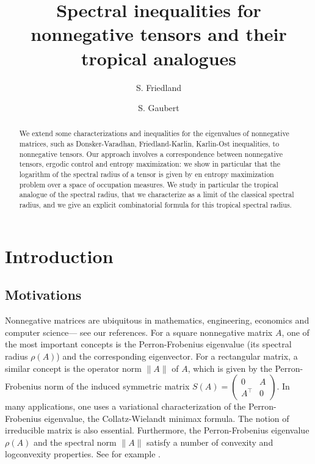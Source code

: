 \documentclass{amsart}
\newcommand{\0}{\mathbf{0}}
\newcommand{\1}{\mathbf{1}}
\newcommand{\trans}{^\top}
\theoremstyle{remark}
\numberwithin{equation}{section} %
\begin{document}
 \title[Spectral inequalities for nonnegative tensors]{
   Spectral inequalities for nonnegative tensors and their tropical analogues}
 \author{S. Friedland}
\author{
%
 S. Gaubert%
 }
%
%
%
%
%
\date{%
}
\address{%
 Department of Mathematics, Statistics and Computer Science,
 University of Illinois at Chicago, Chicago, Illinois 60607-7045,
 USA, \texttt{friedlan@uic.edu},
 }
\address{%
INRIA and Centre de Math\'ematiques Appliqu\'ees (CMAP), \'Ecole polytechnique, UMR 7641 CNRS, 91128 Palaiseau C\'edex, \texttt{stephane.gaubert@inria.fr} }
%



 \maketitle

%
 \begin{abstract}
We extend some characterizations and inequalities for the eigenvalues
of nonnegative matrices, such as Donsker-Varadhan, Friedland-Karlin,
Karlin-Ost inequalities,
%
to nonnegative tensors. Our approach involves
a correspondence between nonnegative tensors, ergodic control and entropy maximization: we show in particular that the logarithm of the spectral radius of a
tensor is given by en entropy maximization problem
over a space of occupation measures.
%
%
We study in particular the tropical analogue of the spectral radius,
that we characterize as a limit of the classical spectral radius,
and we give an explicit combinatorial formula for this tropical spectral
radius.
%
%
%
%
%
 \end{abstract}


%
%
 \section{Introduction}\label{sec:intro}
%
%
%
%
%
%
%
\subsection{Motivations}
 Nonnegative matrices are ubiquitous in mathematics, engineering, economics and computer science---
%
%
see our references.
For a square nonnegative matrix $A$, one of the most important concepts is the Perron-Frobenius eigenvalue (its spectral radius $\rho(A)$) and the corresponding eigenvector.
 For a rectangular matrix, a similar concept is the operator norm $\|A\|$ of $A$, which is given by the
 Perron-Frobenius norm of the induced symmetric matrix
 $S(A)=\left(\begin{smallmatrix}0&A\\A\trans &0\end{smallmatrix}\right)$.  In many applications, one uses a variational characterization of the Perron-Frobenius eigenvalue, the Collatz-Wielandt minimax formula.
The notion of irreducible matrix is also essential.  
Furthermore, the Perron-Frobenius eigenvalue $\rho(A)$ and the spectral
norm $\|A\|$ satisfy a number of convexity and logconvexity properties.
%
See for example \cite{Coh79,Fri81,Fribook,KO85,Kin61,nuss86}.
 
\end{document}
